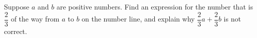Suppose $a$ and $b$ are positive numbers. Find an expression for the number that is $\dfrac{2}{3}$ of the way from $a$ to $b$ on the number line, and explain why $\dfrac{2}{3}a+\dfrac{2}{3}b$ is not correct.
